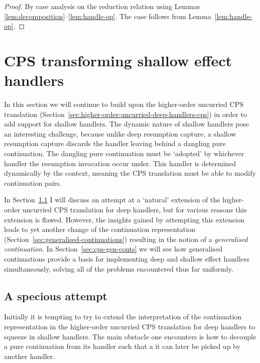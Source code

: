 \documentclass[12pt,phd,lfcs,twoside,openright,logo,leftchapter,normalheadings]{infthesis}
\theoremstyle{plain}
\newtheorem{corollary}[theorem]{Corollary}
\theoremstyle{definition}
\begin{document}
%
\begin{proof}
  By case analysis on the reduction relation using Lemmas
  \ref{lem:decomposition}--\ref{lem:handle-op}. The  case
  follows from Lemma~\ref{lem:handle-op}.
\end{proof}
%
%

\section{CPS transforming shallow effect handlers}
\label{sec:cps-shallow}

In this section we will continue to build upon the higher-order
uncurried CPS translation
(Section~\ref{sec:higher-order-uncurried-deep-handlers-cps}) in order
to add support for shallow handlers. The dynamic nature of shallow
handlers pose an interesting challenge, because unlike deep resumption
capture, a shallow resumption capture discards the handler leaving
behind a dangling pure continuation. The dangling pure continuation
must be `adopted' by whichever handler the resumption invocation occur
under. This handler is determined dynamically by the context, meaning
the CPS translation must be able to modify continuation pairs.

In Section~\ref{sec:cps-shallow-flawed} I will discuss an attempt at a
`natural' extension of the higher-order uncurried CPS translation for
deep handlers, but for various reasons this extension is
flawed. However, the insights gained by attempting this extension
leads to yet another change of the continuation representation
(Section~\ref{sec:generalised-continuations}) resulting in the notion
of a \emph{generalised continuation}.
%
In Section~\ref{sec:cps-gen-conts} we will see how generalised
continuations provide a basis for implementing deep and shallow effect
handlers simultaneously, solving all of the problems encountered thus
far uniformly.

\subsection{A specious attempt}
\label{sec:cps-shallow-flawed}
%
Initially it is tempting to try to extend the interpretation of the
continuation representation in the higher-order uncurried CPS
translation for deep handlers to squeeze in shallow handlers. The main
obstacle one encounters is how to decouple a pure continuation from
its handler such that a it can later be picked up by another handler.
\end{document}
